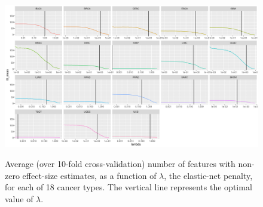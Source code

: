 \begin{figure}
    \centering
    \includegraphics[width=.9\linewidth]{img/enet_cv_l0.png}
    \label{fig:enet_cv_l0}
    \caption{Average (over 10-fold cross-validation) number of features with non-zero effect-size estimates, as a function of $\lambda$, the elastic-net penalty, for each of 18 cancer types.  The vertical line
    represents the optimal value of $\lambda$.}
\end{figure}

 
 

% 

